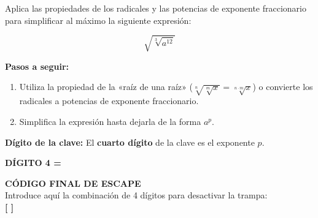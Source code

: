\documentclass[a4paper,12pt]{article}
\begin{document}

\begin{tcolorbox}[title= PRUEBA 4: La Clave de los Radicales (Cuarta Cifra)]
Aplica las propiedades de los radicales y las potencias de exponente fraccionario para simplificar al máximo la siguiente expresión:

\[
\sqrt{\sqrt[3]{a^{12}}}
\]

\textbf{Pasos a seguir:}
\begin{enumerate}
    \item Utiliza la propiedad de la «raíz de una raíz» ($\sqrt[n]{\sqrt[m]{x}} = \sqrt[n \cdot m]{x}$) o convierte los radicales a potencias de exponente fraccionario.
    \item Simplifica la expresión hasta dejarla de la forma $a^p$.
\end{enumerate}

\textbf{Dígito de la clave:} El \textbf{cuarto dígito} de la clave es el exponente $p$.

\hfill \textbf{DÍGITO 4 = } 
\end{tcolorbox}


\begin{center}
\begin{tcolorbox}[colframe=halloweenDark, colback=white, width=0.85\textwidth, halign=center]
    {\Large \textbf{ CÓDIGO FINAL DE ESCAPE}} \\[0.3cm]
    Introduce aquí la combinación de 4 dígitos para desactivar la trampa: \\[0.2cm]
    \textbf{\Large [ \quad {} \quad ]   }
\end{tcolorbox}
\end{center}
\end{document}
